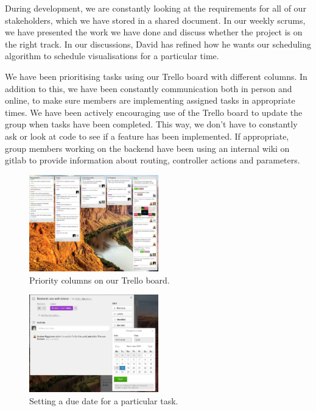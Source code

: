\documentclass[a4paper]{article}
\begin{document}
During development, we are constantly looking at the requirements for 
all of our stakeholders, which 
we have stored in a shared document. In our weekly scrums, we have 
presented the work we have done and discuss whether the project is on the 
right track. In our discussions, David has refined how he wants our
scheduling algorithm to schedule visualisations for a particular time. 



We have been prioritising tasks using our Trello board with different
columns. In addition to this, we have been constantly communication both 
in person and online, to make sure members are implementing assigned tasks
in appropriate times. We have been actively encouraging use of the Trello 
board to update the group when tasks have been completed. This way, 
we don't have to constantly ask or look at code to see if a feature has 
been implemented. If appropriate, group members working on the backend
have been using an internal wiki on gitlab to provide information about
routing, controller actions and parameters. 


\begin{figure}[H]
  \centering
    \includegraphics[width = 0.5\textwidth]{./evaluation/trello-columns.png}

  \caption{Priority columns on our Trello board.}
  \label{fig:columns}
\end{figure}


\begin{figure}[H]
  \centering
    \includegraphics[width = 0.5\textwidth]{./evaluation/trello-due-date.png}

  \caption{Setting a due date for a particular task.}
  \label{fig:deadline}
\end{figure}
\end{document}
